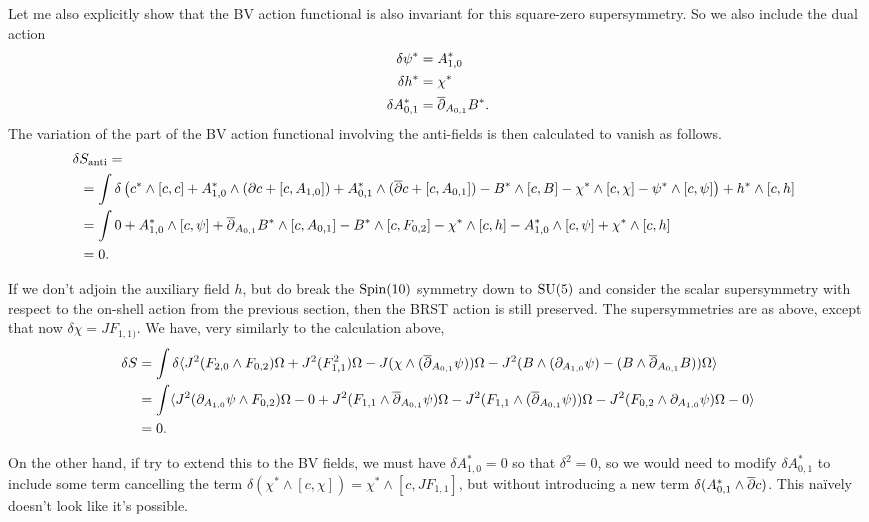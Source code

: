\documentclass[10pt, oneside]{article}
\begin{document}
Let me also explicitly show that the BV action functional is also invariant for this square-zero supersymmetry.  So we also include the dual action
\begin{align*}
\delta \psi^* &= A_{1,0}^* \\
\delta h^* &= \chi^* \\
\delta A_{0,1}^* &= \overline{\partial}_{A_{0,1}} B^*.
\end{align*}
The variation of the part of the BV action functional involving the anti-fields is then calculated to vanish as follows.
\begin{align*}
&\!\!\! \delta S_{\mathrm{anti}} = \\
&= \int \delta \left(c^* \wedge [c, c] + {A^*_{1, 0}}\wedge (\partial c + [c,A_{1,0}]) + {A^*_{0, 1}}\wedge (\overline{\partial} c + [c, A_{0, 1}]) - B^*\wedge [c, B] - \chi^*\wedge [c, \chi] - \psi^*\wedge [c, \psi] \right) + h^* \wedge [c,h] \\
&= \int 0 +A^*_{1,0} \wedge [c,\psi] + \overline{\partial}_{A_{0,1}} B^* \wedge [c,A_{0,1}] - B^* \wedge [c,F_{0,2}] - \chi^* \wedge [c,h] - A_{1,0}^* \wedge [c,\psi] + \chi^* \wedge [c,h] \\
&= 0.
\end{align*}

\begin{remark}
If we don't adjoin the auxiliary field $h$, but do break the $\mathrm{Spin}(10)$ symmetry down to $\mathrm{SU}(5)$ and consider the scalar supersymmetry with respect to the on-shell action from the previous section, then the BRST action is still preserved.  The supersymmetries are as above, except that now $\delta \chi = JF_{1,1)}$.  We have, very similarly to the calculation above,
\begin{align*}
\delta S &= \int \delta \langle J^2(F_{2, 0}\wedge F_{0,2})\Omega + J^2(F_{1,1}^2) \Omega - J( \chi \wedge (\overline{\partial}_{A_{0,1}} \psi)) \Omega - J^2(B \wedge (\partial_{A_{1,0}} \psi) - (B \wedge \overline{\partial}_{A_{0,1}} B)) \Omega \rangle \\
&= \int \langle J^2(\partial_{A_{1,0}} \psi \wedge F_{0,2})\Omega - 0 + J^2(F_{1,1} \wedge \overline{\partial}_{A_{0,1}} \psi) \Omega - J^2( F_{1,1} \wedge (\overline{\partial}_{A_{0,1}} \psi)) \Omega - J^2(F_{0,2} \wedge \partial_{A_{1,0}} \psi)\Omega - 0 \rangle \\
&= 0.
\end{align*}

On the other hand, if try to extend this to the BV fields, we must have $\delta A^*_{1,0} = 0$ so that $\delta^2 = 0$, so we would need to modify $\delta A^*_{0,1}$ to include some term cancelling the term $\delta(\chi^*\wedge [c, \chi]) = \chi^* \wedge [c, JF_{1,1}]$, but without introducing a new term $\delta(A_{0,1}^* \wedge \overline{\partial} c)$.  This na\"ively doesn't look like it's possible.

\end{remark}
\end{document}
